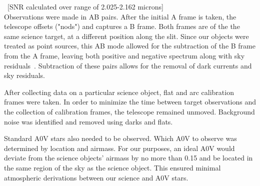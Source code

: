 ~[SNR calculated over range of 2.025-2.162 microns]\\




Observations were made in AB pairs.  After the initial A frame is taken, the telescope offsets ("nods") and captures a B frame.  Both frames are of the the same science target, at a different position along the slit.  Since our objects were treated as point sources, this AB mode allowed for the subtraction of the B frame from the A frame, leaving both positive and negative spectrum along with sky residuals~\cite{Cushing_2004}. Subtraction of these pairs allows for the removal of dark currents and sky residuals.



After collecting data on a particular science object, 
flat and arc calibration frames were taken.  
In order to minimize the time between target observations and 
the collection of calibration frames, the telescope remained unmoved.  
Background noise was identified and removed using darks and flats.



Standard A0V stars also needed to be observed.  Which A0V to observe was 
determined by location and airmass.  For our purposes, an ideal A0V would 
deviate from the science objects' airmass by no more than 0.15 and be located 
in the same region of the sky as the science object.  This ensured minimal 
atmospheric derivations between our science and A0V stars.

